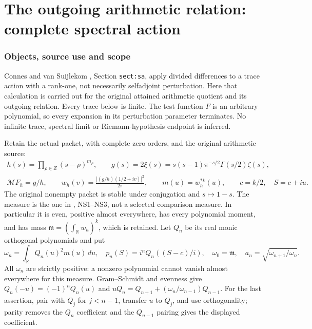

\clearpage\begingroup
\part*{The outgoing arithmetic relation: complete spectral action}
\newcommand{\sapC}{\mathbb C}\newcommand{\sapR}{\mathbb R}
\newcommand{\saptr}{\operatorname{tr}}\newcommand{\sapRes}{\operatorname{Res}}
\newcommand{\sapid}{\operatorname{Id}}\newcommand{\sapdd}{\dagger_G}
\newtheorem{saptheorem}{Theorem}[section]
\newtheorem{saplemma}[saptheorem]{Lemma}


\section{Objects, source use and scope}

Connes and van Suijlekom \cite{sap:CV}, Section \texttt{sect:sa},
apply divided differences to a trace action with a rank-one,
not necessarily selfadjoint perturbation. Here that calculation
is carried out for the original attained arithmetic quotient
and its outgoing relation. Every trace below is finite.
The test function $F$ is an arbitrary polynomial, so every
expansion in its perturbation parameter terminates. No
infinite trace, spectral limit or Riemann-hypothesis endpoint
is inferred.

Retain the actual packet, with complete zero orders, and
the original arithmetic source:
\begin{equation}\tag{SA1}\label{sap:SA1}
\begin{gathered}
h(s)=\prod_{\rho\in Z}(s-\rho)^{m_\rho},\qquad
g(s)=2\xi(s)=s(s-1)\pi^{-s/2}\Gamma(s/2)\zeta(s),\\
\mathcal MF_h=g/h,\qquad
w_h(v)=\frac{|(g/h)(1/2+iv)|^2}{2\pi},\qquad
m(u)=w_h^{*k}(u),\qquad c=k/2,\quad S=c+iu.
\end{gathered}
\end{equation}
The original nonempty packet is stable under conjugation
and $s\mapsto1-s$. The measure is the one in \cite{sap:Native},
NS1--NS3, not a selected comparison measure. In particular
it is even, positive almost everywhere, has every polynomial
moment, and has mass
$\mathfrak m=(\int_\sapR w_h)^k$, which is retained.
Let $Q_n$ be its real monic orthogonal polynomials and put
\begin{equation}\tag{SA2}\label{sap:SA2}
\omega_n=\int_\sapR Q_n(u)^2m(u)\,du,\quad
p_n(S)=i^nQ_n((S-c)/i),\quad
\omega_0=\mathfrak m,\quad
a_n=\sqrt{\omega_{n+1}/\omega_n}.
\end{equation}
All $\omega_n$ are strictly positive: a nonzero polynomial
cannot vanish almost everywhere for this measure.
Gram--Schmidt and evenness give
$Q_n(-u)=(-1)^nQ_n(u)$ and
$uQ_n=Q_{n+1}+(\omega_n/\omega_{n-1})Q_{n-1}$.
For the last assertion, pair with $Q_j$ for $j<n-1$,
transfer $u$ to $Q_j$, and use orthogonality; parity removes
the $Q_n$ coefficient and the $Q_{n-1}$ pairing gives
the displayed coefficient.

